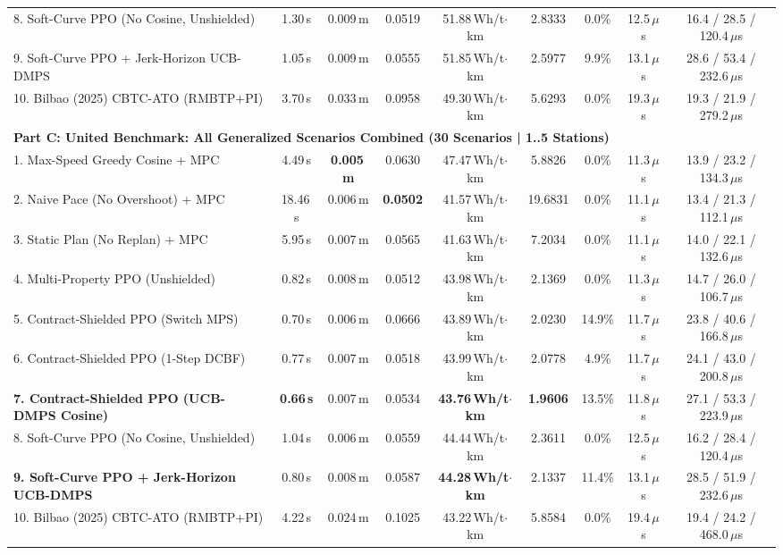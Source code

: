\documentclass[10pt,a4paper]{article}
\begin{document}
\begin{table}[h!]
{\begin{tabular}{lcccccccc}
8. Soft-Curve PPO (No Cosine, Unshielded) & 1.30\,s & 0.009\,m & 0.0519 & 51.88\,Wh/t$\cdot$km & 2.8333 & 0.0\% & 12.5\,$\mu$s & 16.4 / 28.5 / 120.4\,$\mu$s \\
9. Soft-Curve PPO + Jerk-Horizon UCB-DMPS & 1.05\,s & 0.009\,m & 0.0555 & 51.85\,Wh/t$\cdot$km & 2.5977 & 9.9\% & 13.1\,$\mu$s & 28.6 / 53.4 / 232.6\,$\mu$s \\
10. Bilbao (2025) CBTC-ATO (RMBTP+PI) \cite{ref17} & 3.70\,s & 0.033\,m & 0.0958 & 49.30\,Wh/t$\cdot$km & 5.6293 & 0.0\% & 19.3\,$\mu$s & 19.3 / 21.9 / 279.2\,$\mu$s \\
\midrule
\multicolumn{9}{l}{\textbf{Part C: United Benchmark: All Generalized Scenarios Combined (30 Scenarios | 1..5 Stations)}} \\
\midrule
1. Max-Speed Greedy Cosine + MPC & 4.49\,s & \textbf{0.005\,m} & 0.0630 & 47.47\,Wh/t$\cdot$km & 5.8826 & 0.0\% & 11.3\,$\mu$s & 13.9 / 23.2 / 134.3\,$\mu$s \\
2. Naive Pace (No Overshoot) + MPC & 18.46\,s & 0.006\,m & \textbf{0.0502} & 41.57\,Wh/t$\cdot$km & 19.6831 & 0.0\% & 11.1\,$\mu$s & 13.4 / 21.3 / 112.1\,$\mu$s \\
3. Static Plan (No Replan) + MPC & 5.95\,s & 0.007\,m & 0.0565 & 41.63\,Wh/t$\cdot$km & 7.2034 & 0.0\% & 11.1\,$\mu$s & 14.0 / 22.1 / 132.6\,$\mu$s \\
4. Multi-Property PPO (Unshielded) & 0.82\,s & 0.008\,m & 0.0512 & 43.98\,Wh/t$\cdot$km & 2.1369 & 0.0\% & 11.3\,$\mu$s & 14.7 / 26.0 / 106.7\,$\mu$s \\
5. Contract-Shielded PPO (Switch MPS) & 0.70\,s & 0.006\,m & 0.0666 & 43.89\,Wh/t$\cdot$km & 2.0230 & 14.9\% & 11.7\,$\mu$s & 23.8 / 40.6 / 166.8\,$\mu$s \\
6. Contract-Shielded PPO (1-Step DCBF) & 0.77\,s & 0.007\,m & 0.0518 & 43.99\,Wh/t$\cdot$km & 2.0778 & 4.9\% & 11.7\,$\mu$s & 24.1 / 43.0 / 200.8\,$\mu$s \\
\textbf{7. Contract-Shielded PPO (UCB-DMPS Cosine)} & \textbf{0.66\,s} & 0.007\,m & 0.0534 & \textbf{43.76\,Wh/t$\cdot$km} & \textbf{1.9606} & 13.5\% & 11.8\,$\mu$s & 27.1 / 53.3 / 223.9\,$\mu$s \\
8. Soft-Curve PPO (No Cosine, Unshielded) & 1.04\,s & 0.006\,m & 0.0559 & 44.44\,Wh/t$\cdot$km & 2.3611 & 0.0\% & 12.5\,$\mu$s & 16.2 / 28.4 / 120.4\,$\mu$s \\
\textbf{9. Soft-Curve PPO + Jerk-Horizon UCB-DMPS} & 0.80\,s & 0.008\,m & 0.0587 & \textbf{44.28\,Wh/t$\cdot$km} & 2.1337 & 11.4\% & 13.1\,$\mu$s & 28.5 / 51.9 / 232.6\,$\mu$s \\
10. Bilbao (2025) CBTC-ATO (RMBTP+PI) \cite{ref17} & 4.22\,s & 0.024\,m & 0.1025 & 43.22\,Wh/t$\cdot$km & 5.8584 & 0.0\% & 19.4\,$\mu$s & 19.4 / 24.2 / 468.0\,$\mu$s \\
\bottomrule
\end{tabular}%
}
\end{table}
\end{document}
